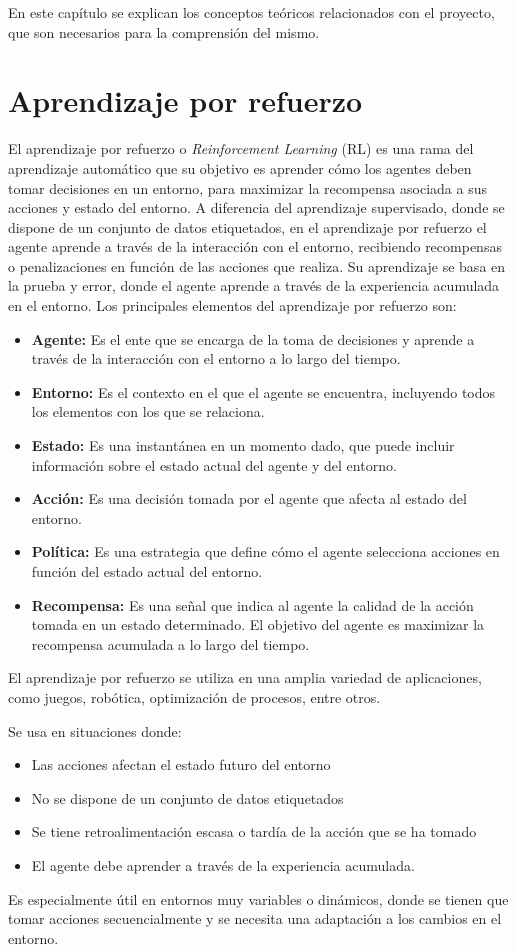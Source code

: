 En este capítulo se explican los conceptos teóricos relacionados con el proyecto, que son necesarios para la comprensión del mismo.

\section{Aprendizaje por refuerzo}
El aprendizaje por refuerzo o \textit{Reinforcement Learning} (RL) es una rama del aprendizaje automático que su objetivo es aprender cómo los agentes deben tomar decisiones en un entorno, para maximizar la recompensa asociada a sus acciones y estado del entorno. A diferencia del aprendizaje supervisado, donde se dispone de un conjunto de datos etiquetados, en el aprendizaje por refuerzo el agente aprende a través de la interacción con el entorno, recibiendo recompensas o penalizaciones en función de las acciones que realiza. Su aprendizaje se basa en la prueba y error, donde el agente aprende a través de la experiencia acumulada en el entorno.
Los principales elementos del aprendizaje por refuerzo son:
\begin{itemize}
	\item \textbf{Agente:} Es el ente que se encarga de la toma de decisiones y aprende a través de la interacción con el entorno a lo largo del tiempo.
	\item \textbf{Entorno:} Es el contexto en el que el agente se encuentra, incluyendo todos los elementos con los que se relaciona.
	\item \textbf{Estado:} Es una instantánea en un momento dado, que puede incluir información sobre el estado actual del agente y del entorno.
	\item \textbf{Acción:} Es una decisión tomada por el agente que afecta al estado del entorno.
	\item \textbf{Política:} Es una estrategia que define cómo el agente selecciona acciones en función del estado actual del entorno.
	\item \textbf{Recompensa:} Es una señal que indica al agente la calidad de la acción tomada en un estado determinado. El objetivo del agente es maximizar la recompensa acumulada a lo largo del tiempo.
\end{itemize}

El aprendizaje por refuerzo se utiliza en una amplia variedad de aplicaciones, como juegos, robótica, optimización de procesos, entre otros.

Se usa en situaciones donde:
\begin{itemize}
	\item Las acciones afectan el estado futuro del entorno
	\item No se dispone de un conjunto de datos etiquetados
	\item Se tiene retroalimentación escasa o tardía de la acción que se ha tomado
	\item El agente debe aprender a través de la experiencia acumulada.
\end{itemize}
Es especialmente útil en entornos muy variables o dinámicos, donde se tienen que tomar acciones secuencialmente y se necesita una adaptación a los cambios en el entorno.


